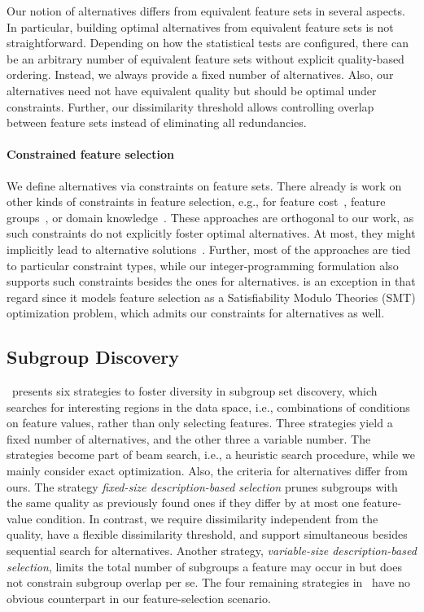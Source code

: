 \documentclass{article}
\theoremstyle{definition}
\begin{document}
Our notion of alternatives differs from equivalent feature sets in several aspects.
In particular, building optimal alternatives from equivalent feature sets is not straightforward.
Depending on how the statistical tests are configured, there can be an arbitrary number of equivalent feature sets without explicit quality-based ordering.
Instead, we always provide a fixed number of alternatives.
Also, our alternatives need not have equivalent quality but should be optimal under constraints.
Further, our dissimilarity threshold allows controlling overlap between feature sets instead of eliminating all redundancies.

\paragraph{Constrained feature selection}

We define alternatives via constraints on feature sets.
There already is work on other kinds of constraints in feature selection, e.g., for feature cost~\cite{paclik2002feature}, feature groups~\cite{yuan2006model}, or domain knowledge~\cite{bach2022empirical, groves2015toward}.
These approaches are orthogonal to our work, as such constraints do not explicitly foster optimal alternatives.
At most, they might implicitly lead to alternative solutions~\cite{bach2022empirical}.
Further, most of the approaches are tied to particular constraint types, while our integer-programming formulation also supports such constraints besides the ones for alternatives.
\cite{bach2022empirical} is an exception in that regard since it models feature selection as a Satisfiability Modulo Theories (\textsc{SMT}) optimization problem, which admits our constraints for alternatives as well.

\subsection{Subgroup Discovery}
\label{sec:afs:related-work:subgroup-discovery}

\cite{leeuwen2012diverse}~presents six strategies to foster diversity in subgroup set discovery, which searches for interesting regions in the data space, i.e., combinations of conditions on feature values, rather than only selecting features.
Three strategies yield a fixed number of alternatives, and the other three a variable number.
The strategies become part of beam search, i.e., a heuristic search procedure, while we mainly consider exact optimization.
Also, the criteria for alternatives differ from ours.
The strategy \emph{fixed-size description-based selection} prunes subgroups with the same quality as previously found ones if they differ by at most one feature-value condition.
In contrast, we require dissimilarity independent from the quality, have a flexible dissimilarity threshold, and support simultaneous besides sequential search for alternatives.
Another strategy, \emph{variable-size description-based selection}, limits the total number of subgroups a feature may occur in but does not constrain subgroup overlap per se.
The four remaining strategies in~\cite{leeuwen2012diverse} have no obvious counterpart in our feature-selection scenario.
\end{document}
